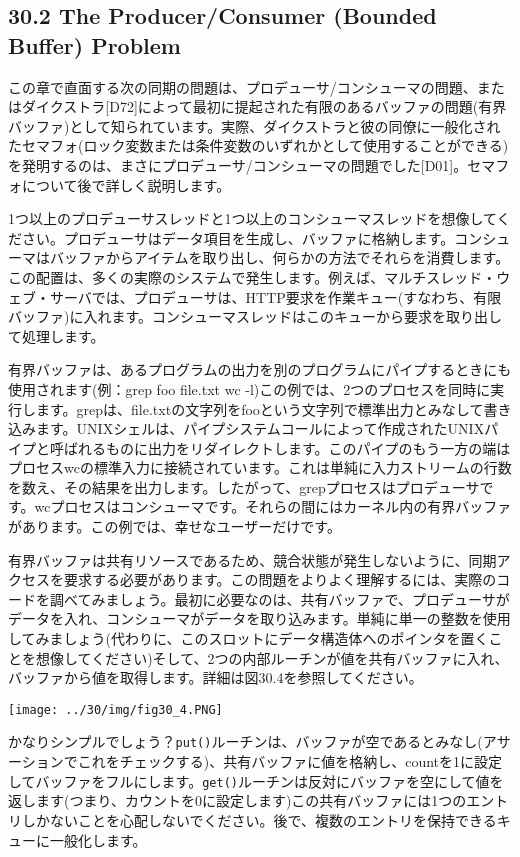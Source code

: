 \hypertarget{the-producerconsumer-bounded-buffer-problem}{%
\subsection*{30.2 The Producer/Consumer (Bounded Buffer)
Problem}\label{the-producerconsumer-bounded-buffer-problem}}

この章で直面する次の同期の問題は、プロデューサ/コンシューマの問題、またはダイクストラ{[}D72{]}によって最初に提起された有限のあるバッファの問題(有界バッファ)として知られています。実際、ダイクストラと彼の同僚に一般化されたセマフォ(ロック変数または条件変数のいずれかとして使用することができる)を発明するのは、まさにプロデューサ/コンシューマの問題でした{[}D01{]}。セマフォについて後で詳しく説明します。

1つ以上のプロデューサスレッドと1つ以上のコンシューマスレッドを想像してください。プロデューサはデータ項目を生成し、バッファに格納します。コンシューマはバッファからアイテムを取り出し、何らかの方法でそれらを消費します。この配置は、多くの実際のシステムで発生します。例えば、マルチスレッド・ウェブ・サーバでは、プロデューサは、HTTP要求を作業キュー(すなわち、有限バッファ)に入れます。コンシューマスレッドはこのキューから要求を取り出して処理します。

有界バッファは、あるプログラムの出力を別のプログラムにパイプするときにも使用されます(例：grep
foo file.txt \textbar{} wc
-l)この例では、2つのプロセスを同時に実行します。grepは、file.txtの文字列をfooという文字列で標準出力とみなして書き込みます。UNIXシェルは、パイプシステムコールによって作成されたUNIXパイプと呼ばれるものに出力をリダイレクトします。このパイプのもう一方の端はプロセスwcの標準入力に接続されています。これは単純に入力ストリームの行数を数え、その結果を出力します。したがって、grepプロセスはプロデューサです。wcプロセスはコンシューマです。それらの間にはカーネル内の有界バッファがあります。この例では、幸せなユーザーだけです。

有界バッファは共有リソースであるため、競合状態が発生しないように、同期アクセスを要求する必要があります。この問題をよりよく理解するには、実際のコードを調べてみましょう。最初に必要なのは、共有バッファで、プロデューサがデータを入れ、コンシューマがデータを取り込みます。単純に単一の整数を使用してみましょう(代わりに、このスロットにデータ構造体へのポインタを置くことを想像してください)そして、2つの内部ルーチンが値を共有バッファに入れ、バッファから値を取得します。詳細は図30.4を参照してください。

\texttt{[image: ../30/img/fig30\_4.PNG]}

かなりシンプルでしょう？\texttt{put()}ルーチンは、バッファが空であるとみなし(アサーションでこれをチェックする)、共有バッファに値を格納し、countを1に設定してバッファをフルにします。\texttt{get()}ルーチンは反対にバッファを空にして値を返します(つまり、カウントを0に設定します)この共有バッファには1つのエントリしかないことを心配しないでください。後で、複数のエントリを保持できるキューに一般化します。

